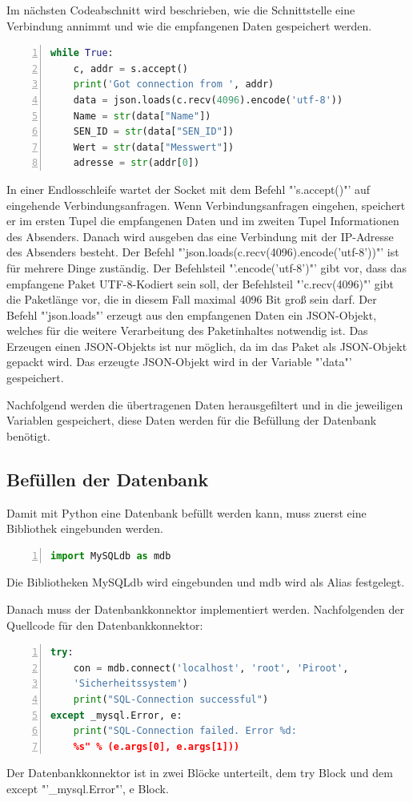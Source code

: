Im nächsten Codeabschnitt wird beschrieben, wie die Schnittstelle eine Verbindung annimmt und wie die empfangenen Daten gespeichert werden.
\begin{lstlisting}[caption=Speichern der empfangenen Daten,frame=single,numbers=left,language=Python,showstringspaces=false]
while True:
	c, addr = s.accept()
	print('Got connection from ', addr)
	data = json.loads(c.recv(4096).encode('utf-8'))
	Name = str(data["Name"])
	SEN_ID = str(data["SEN_ID"])
	Wert = str(data["Messwert"])
	adresse = str(addr[0])
\end{lstlisting}\label{Daten}
In einer Endlosschleife wartet der Socket mit dem Befehl "'s.accept()"' auf eingehende Verbindungsanfragen. Wenn Verbindungsanfragen eingehen, speichert er im ersten Tupel die empfangenen Daten und im zweiten Tupel Informationen des Absenders. Danach wird ausgeben das eine Verbindung mit der IP-Adresse des Absenders besteht. Der Befehl "'json.loads(c.recv(4096).encode('utf-8'))"' ist für mehrere Dinge zuständig. Der Befehlsteil "'.encode('utf-8')"' gibt vor, dass das empfangene Paket UTF-8-Kodiert sein soll, der Befehlsteil "'c.recv(4096)"' gibt die Paketlänge vor, die in diesem Fall maximal 4096 Bit groß sein darf. Der Befehl "'json.loads"' erzeugt aus den empfangenen Daten ein JSON-Objekt, welches für die weitere Verarbeitung des Paketinhaltes notwendig ist. Das Erzeugen einen JSON-Objekts ist nur möglich, da im  das Paket als JSON-Objekt gepackt wird. Das erzeugte JSON-Objekt wird in der Variable "'data"' gespeichert. 

Nachfolgend werden die übertragenen Daten herausgefiltert und in die jeweiligen Variablen gespeichert, diese Daten werden für die Befüllung der Datenbank benötigt.

\subsection{Befüllen der Datenbank}
Damit mit Python eine Datenbank befüllt werden kann, muss zuerst eine Bibliothek eingebunden werden.
\begin{lstlisting}[caption=Einbinden der Bibliothek für die Datenbank,frame=single,numbers=left,language=Python]
import MySQLdb as mdb
\end{lstlisting}
Die Bibliotheken MySQLdb wird eingebunden und mdb wird als Alias festgelegt.

Danach muss der Datenbankkonnektor implementiert werden. Nachfolgenden der Quellcode für den Datenbankkonnektor:
\begin{lstlisting}[caption=Datenbankkonnekor,frame=single,numbers=left,language=Python,showstringspaces=false]
try:
	con = mdb.connect('localhost', 'root', 'Piroot',
	'Sicherheitssystem')
	print("SQL-Connection successful")
except _mysql.Error, e:
	print("SQL-Connection failed. Error %d:
	%s" % (e.args[0], e.args[1]))
\end{lstlisting}
Der Datenbankkonnektor ist in zwei Blöcke unterteilt, dem try Block und dem except "'\_mysql.Error"', e Block.

